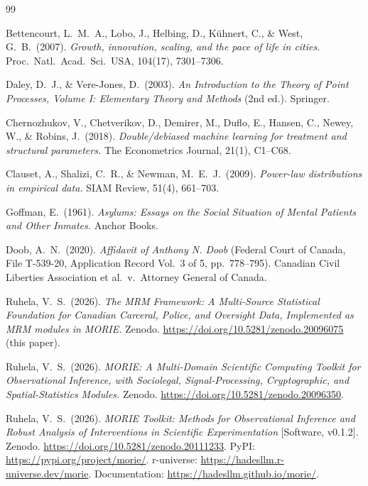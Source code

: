 \documentclass[11pt,a4paper]{article}
\theoremstyle{plain}
\theoremstyle{definition}
\theoremstyle{remark}
\begin{document}

\begin{thebibliography}{99}

Bettencourt, L.\ M.\ A., Lobo, J., Helbing, D., K\"uhnert, C., \&
West, G.\ B.\ (2007).
\emph{Growth, innovation, scaling, and the pace of life in
cities.}
Proc.\ Natl.\ Acad.\ Sci.\ USA, 104(17), 7301--7306.

Daley, D.\ J., \& Vere-Jones, D.\ (2003).
\emph{An Introduction to the Theory of Point Processes,
Volume I: Elementary Theory and Methods} (2nd ed.).
Springer.

Chernozhukov, V., Chetverikov, D., Demirer, M., Duflo, E.,
Hansen, C., Newey, W., \& Robins, J.\ (2018).
\emph{Double/debiased machine learning for treatment and
structural parameters.}
The Econometrics Journal, 21(1), C1--C68.

Clauset, A., Shalizi, C.\ R., \& Newman, M.\ E.\ J.\ (2009).
\emph{Power-law distributions in empirical data.}
SIAM Review, 51(4), 661--703.

Goffman, E.\ (1961).
\emph{Asylums: Essays on the Social Situation of Mental Patients
and Other Inmates.}
Anchor Books.

Doob, A.\ N.\ (2020).
\emph{Affidavit of Anthony N. Doob} (Federal Court of Canada,
File T-539-20, Application Record Vol.\ 3 of 5, pp.\ 778--795).
Canadian Civil Liberties Association et al.\ v.\ Attorney General
of Canada.

Ruhela, V.\ S.\ (2026).
\emph{The MRM Framework: A Multi-Source Statistical Foundation
for Canadian Carceral, Police, and Oversight Data, Implemented
as MRM modules in MORIE.}
Zenodo. \url{https://doi.org/10.5281/zenodo.20096075} (this paper).

Ruhela, V.\ S.\ (2026).
\emph{MORIE: A Multi-Domain Scientific Computing Toolkit for
Observational Inference, with Sociolegal, Signal-Processing,
Cryptographic, and Spatial-Statistics Modules.}
Zenodo. \url{https://doi.org/10.5281/zenodo.20096350}.

Ruhela, V.\ S.\ (2026).
\emph{MORIE Toolkit: Methods for Observational Inference and
Robust Analysis of Interventions in Scientific Experimentation}
[Software, v0.1.2].
Zenodo. \url{https://doi.org/10.5281/zenodo.20111233}.
PyPI: \url{https://pypi.org/project/morie/}.
r-universe: \url{https://hadesllm.r-universe.dev/morie}.
Documentation: \url{https://hadesllm.github.io/morie/}.


\end{thebibliography}
\end{document}
